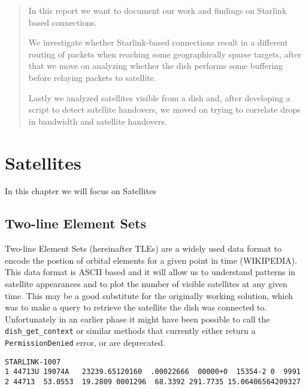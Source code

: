 \documentclass[IN,11pt,twoside,openright,bachelor,english]{tumthesis}
\author{Roberto Castellotti}
\date{September 15, 2016}
\begin{document}
%


\maketitle%
\cleardoublepage


\begin{abstract} 
In this report we want to document our work and findings on Starlink based connections. 

We investigate whether Starlink-based connections result in a different routing of packets when reaching some geographically sparse targets, after that we move on analyzing whether the dish performs some buffering before relaying packets to satellite.

Lastly we analyzed satellites visible from a dish and, after developing a script to detect satellite handovers, we moved on trying to correlate  drops in bandwidth and satellite handovers.
\end{abstract}


\begin{thanks}
\end{thanks}

\tableofcontents
\listoffigures
\listoftables

\startcontent

\chapter{Satellites}
\label{chap:sats}
In this chapter we will focus on Satellites
\section{Two-line Element Sets}
Two-line Element Sets (hereinafter TLEs) are a widely used data format to encode the postion of orbital elements for a given point in time (WIKIPEDIA). This data format is ASCII based and it will allow us to understand patterns in satellite appearances and to plot the number of visible satellites at any given time. This may be a good substitute for the originally working solution, which was to make a query to retrieve the satellite the dish was connected to. Unfortunately in an earlier phase it might have been possible to call the \texttt{dish\_get\_context} or similar methods that currently either return a \texttt{PermissionDenied} error, or are deprecated.

\begin{lstlisting}[caption={TLE for satellite STARLINK-1007 },captionpos=b]
STARLINK-1007           
1 44713U 19074A   23239.65120160  .00022666  00000+0  15354-2 0  9991
2 44713  53.0553  19.2809 0001296  68.3392 291.7735 15.06406564209327
\end{lstlisting}
\end{document}
